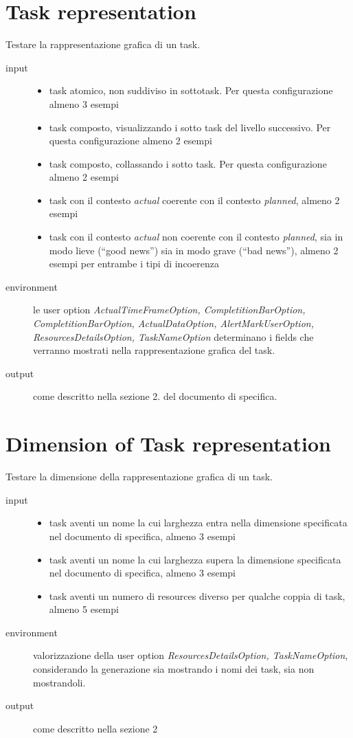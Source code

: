 \section{Task representation}
\label{sec:WBSTaskRepresentation}
Testare la rappresentazione grafica di un task.
\begin{description}
\item[input] 
\quad
\begin{itemize}
  \item task atomico, non suddiviso in sottotask. Per questa configurazione
  almeno 3 esempi
  \item task composto, visualizzando i sotto task del livello successivo. Per
  questa configurazione almeno 2 esempi
  \item task composto, collassando i sotto task.  Per questa configurazione
  almeno 2 esempi
  \item task con il contesto \emph{actual} coerente con il contesto
  \emph{planned}, almeno 2 esempi
  \item task con il contesto \emph{actual} non coerente con il contesto
  \emph{planned}, sia in modo lieve (``good news'') sia in modo grave (``bad
  news''), almeno 2 esempi per entrambe i tipi di incoerenza
\end{itemize}
\item[environment] le user option
\emph{ActualTimeFrameOption, CompletitionBarOption, CompletitionBarOption, 
ActualDataOption, AlertMarkUserOption, ResourcesDetailsOption, TaskNameOption}
determinano i fields che verranno mostrati nella rappresentazione grafica del task.
\item[output] come descritto nella sezione 2. del documento di specifica.
\end{description}

\section{Dimension of Task representation}
\label{sec:WBSDimensionRepresentation}
Testare la dimensione della rappresentazione grafica di un task.
\begin{description}
\item[input] 
\quad
\begin{itemize}
  \item task aventi un nome la cui larghezza entra nella dimensione specificata
  nel documento di specifica, almeno 3 esempi
  \item task aventi un nome la cui larghezza supera la dimensione specificata
  nel documento di specifica, almeno 3 esempi
  \item task aventi un numero di resources diverso per qualche coppia di task,
  almeno 5 esempi
\end{itemize}
\item[environment] valorizzazione della user option
\emph{ResourcesDetailsOption, TaskNameOption}, considerando la generazione sia
mostrando i nomi dei task, sia non mostrandoli.
\item[output] come descritto nella sezione 2
\end{description}

